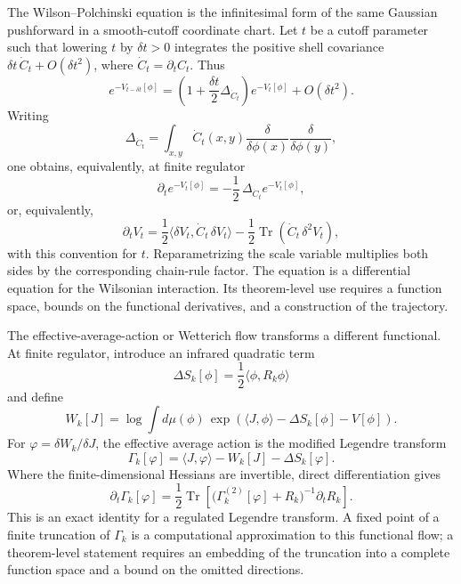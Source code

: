 The Wilson--Polchinski equation is the infinitesimal form of the same
Gaussian pushforward in a smooth-cutoff coordinate chart.  Let \(t\) be a
cutoff parameter such that lowering \(t\) by \(\delta t>0\) integrates the
positive shell covariance \(\delta t\,\dot C_t+O(\delta t^2)\), where
\(\dot C_t=\partial_t C_t\).  Thus
\begin{equation}
  e^{-V_{t-\delta t}[\phi]}
  =
  \left(1+\frac{\delta t}{2}\Delta_{\dot C_t}\right)
  e^{-V_t[\phi]}+O(\delta t^2).
  \label{eq:infinitesimal-gaussian-pushforward-taxonomy}
\end{equation}
Writing
\[
  \Delta_{\dot C_t}
  =
  \int_{x,y}\dot C_t(x,y)
  \frac{\delta}{\delta\phi(x)}
  \frac{\delta}{\delta\phi(y)} ,
\]
one obtains, equivalently, at finite regulator
\begin{equation}
  \partial_t e^{-V_t[\phi]}
  =
  -\frac12\,\Delta_{\dot C_t} e^{-V_t[\phi]} ,
  \label{eq:polchinski-exponential-form-rg-taxonomy}
\end{equation}
or, equivalently,
\begin{equation}
  \partial_t V_t
  =
  \frac12\langle \delta V_t,\dot C_t\,\delta V_t\rangle
  -\frac12\operatorname{Tr}(\dot C_t\,\delta^2 V_t),
  \label{eq:polchinski-action-form-rg-taxonomy}
\end{equation}
with this convention for \(t\).  Reparametrizing the scale variable multiplies
both sides by the corresponding chain-rule factor.  The equation is a
differential equation for the Wilsonian interaction.  Its theorem-level use
requires a function space, bounds on the functional derivatives, and a
construction of the trajectory.

The effective-average-action or Wetterich flow transforms a different
functional.  At finite regulator, introduce an infrared quadratic term
\[
  \Delta S_k[\phi]=\frac12\langle \phi,R_k\phi\rangle
\]
and define
\[
  W_k[J]=\log\int d\mu(\phi)\,
  \exp\!\left(\langle J,\phi\rangle-\Delta S_k[\phi]-V[\phi]\right).
\]
For \(\varphi=\delta W_k/\delta J\), the effective average action is the
modified Legendre transform
\begin{equation}
  \Gamma_k[\varphi]
  =
  \langle J,\varphi\rangle-W_k[J]-\Delta S_k[\varphi].
  \label{eq:effective-average-action-rg-taxonomy}
\end{equation}
Where the finite-dimensional Hessians are invertible, direct
differentiation gives
\begin{equation}
  \partial_t\Gamma_k[\varphi]
  =
  \frac12\operatorname{Tr}\!\left[
    \bigl(\Gamma_k^{(2)}[\varphi]+R_k\bigr)^{-1}\partial_tR_k
  \right].
  \label{eq:wetterich-rg-taxonomy}
\end{equation}
This is an exact identity for a regulated Legendre transform.  A fixed point
of a finite truncation of \(\Gamma_k\) is a computational approximation to
this functional flow; a theorem-level statement requires an embedding of the
truncation into a complete function space and a bound on the omitted
directions.

